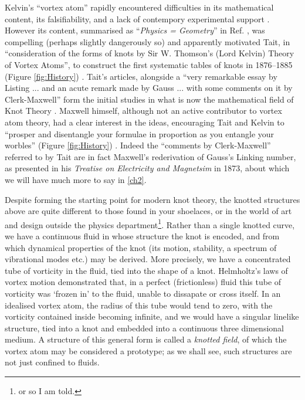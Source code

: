 Kelvin's ``vortex atom'' rapidly encountered difficulties in its mathematical content, its falsifiability, and a lack of contempory experimental support \citep{KelvinMasters}. However its content, summarised as ``\textit{Physics = Geometry}'' in Ref. \citep{KelvinAMS}, was compelling (perhaps slightly dangerously so) and apparently motivated Tait, in ``consideration of the forms of knots by Sir W. Thomson's (Lord Kelvin) Theory of Vortex Atoms'', to construct the first systematic tables of knots in 1876--1885 (Figure \ref{fig:History}) \citep{Tait1, Tait2, Tait3}. Tait's articles, alongside a ``very remarkable essay by Listing ... and an acute remark made by Gauss ... with some comments on it by Clerk-Maxwell'' \citep{Tait}form the initial studies in  what is now the mathematical field of Knot Theory \cite{Lickorish}. Maxwell himself, although not an active contributor to vortex atom theory, had a clear interest in the ideas, encouraging Tait and Kelvin to ``prosper and disentangle your formulae in proportion as you entangle your worbles'' (Figure \ref{fig:History}) \citep{MaxwellTaitLetter}. Indeed the ``comments by Clerk-Maxwell'' referred to by Tait are in fact Maxwell's rederivation of Gauss's Linking number, as presented in his \textit{Treatise on Electricity and Magnetsim} in 1873, about which we will have much more to say in \ref{ch2}. 

Despite forming the starting point for modern knot theory, the knotted structures above are quite different to those found in your shoelaces, or in the world of art and design outside the physics department\footnote{or so I am told.}. Rather than a single knotted curve, we have a continuous fluid in whose structure the knot is encoded, and from which dynamical properties of the knot (its motion, stability, a spectrum of vibrational modes etc.) may be derived. More precisely, we have a concentrated tube of vorticity in the fluid, tied into the shape of a knot. Helmholtz's laws of vortex motion demonstrated that, in a perfect (frictionless) fluid this tube of vorticity was `frozen in' to the fluid, unable to dissapate or cross itself. In an idealised vortex atom, the radius of this tube would tend to zero, with the vorticity contained inside becoming infinite, and we would have a singular linelike structure, tied into a knot and embedded into a continuous three dimensional medium. A structure of this general form is called a \emph{knotted field}, of which the vortex atom may be considered a prototype; as we shall see, such structures are not just confined to fluids. 

